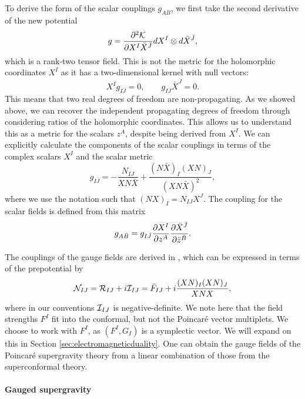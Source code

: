 To derive the form of the scalar couplings $g_{A\bar{B}}$, we first take the second derivative of the new potential
\begin{equation}
    g = \frac{\partial ^2 {\cal K}}{\partial X^I \bar{X}^{\bar{J}}} dX^I \otimes d\bar{X}^{\bar{J}},
\end{equation}
which is a rank-two tensor field. This is not the metric for the holomorphic coordinates $X^I$ as it has a two-dimensional kernel with null vectors:
\begin{equation*}
	X^I g_{I \bar{J}} = 0, \qquad g_{I \bar{J}} \bar{X}^{\bar{J}} = 0.
\end{equation*}
This means that two real degrees of freedom are non-propagating. As we showed above, we can recover the independent propagating degrees of freedom through considering ratios of the holomorphic coordinates. This allows us to understand this as a metric for the scalars $z^A$, despite being derived from $X^I$. We can explicitly calculate the components of the scalar couplings in terms of the complex scalars $X^I$ and the scalar metric
\begin{equation}
\label{eq:gij}
    g_{I\bar{J}} = - \frac{N_{IJ}}{XN\bar{X}} +  \frac{(N\bar{X})_I(XN)_J}{(XN\bar{X})^2} ,
\end{equation}
where we use the notation such that $(NX)_I = N_{IJ} X^J$. The coupling for the scalar fields is defined from this matrix
\begin{equation}
\label{eq:scalargab}
	 g_{A\bar{B}} =  g_{I\bar{J}} \frac{\partial X^I}{\partial z^A} \frac{\partial \bar{X}^{\bar{J}}}{\partial \bar{z}^{\bar{B}}}.
\end{equation}

The couplings of the gauge fields are derived in \cite{Mohaupt:2000mj}, which can be expressed in terms of the prepotential by \cite{Cortes:2009cs}
\begin{equation}
\label{eq:cN}
   {\cal N}_{IJ} = {\cal R}_{IJ} + i{\cal I}_{IJ} = \bar{F}_{IJ} + i \frac{(XN)_I (XN)_J}{XNX},
\end{equation}
where in our conventions ${\cal I}_{IJ}$ is negative-definite. We note here that the field strengths $F^I$ fit into the conformal, but not the Poincar\'e vector multiplets. We choose to work with $F^I$, as $(F^I, G_I)$ is a symplectic vector. We will expand on this in Section \ref{sec:electromagneticduality}. One can obtain the gauge fields of the Poincar\'e supergravity theory from a linear combination of those from the superconformal theory. 

\paragraph{Gauged supergravity}

